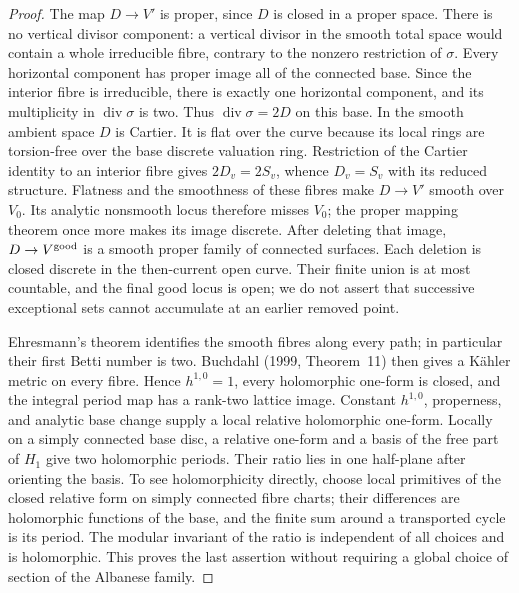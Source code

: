 \begin{proof}
The map \(D\to V'\) is proper, since \(D\) is closed in a proper
space. There is no vertical divisor component: a vertical divisor in
the smooth total space would contain a whole irreducible fibre,
contrary to the nonzero restriction of \(\sigma\). Every horizontal
component has proper image all of the connected base. Since the
interior fibre is irreducible, there is exactly one horizontal
component, and its multiplicity in \(\operatorname{div}\sigma\) is
two. Thus \(\operatorname{div}\sigma=2D\) on this base. In the smooth
ambient space \(D\) is Cartier. It is flat over the curve because
its local rings are torsion-free over the base discrete valuation
ring. Restriction of the Cartier identity to an interior fibre gives
\(2D_v=2S_v\), whence \(D_v=S_v\) with its reduced structure.
Flatness and the smoothness of these fibres make \(D\to V'\) smooth
over \(V_0\). Its analytic nonsmooth locus therefore misses \(V_0\);
the proper mapping theorem once more makes its image discrete.
After deleting that image, \(D\to V^{\rm good}\) is a smooth proper
family of connected surfaces. Each deletion is closed discrete in the
then-current open curve. Their finite union is at most countable,
and the final good locus is open; we do not assert that successive
exceptional sets cannot accumulate at an earlier removed point.

Ehresmann's theorem identifies the smooth fibres along every path;
in particular their first Betti number is two. Buchdahl (1999,
Theorem~11) then gives a K\"ahler metric on every fibre. Hence
\(h^{1,0}=1\), every holomorphic one-form is closed, and the integral
period map has a rank-two lattice image. Constant \(h^{1,0}\),
properness, and analytic base change supply a local relative
holomorphic one-form. Locally on a simply connected
base disc, a relative one-form and a basis of the free part of
\(H_1\) give two holomorphic periods. Their ratio lies in one
half-plane after orienting the basis. To see holomorphicity directly,
choose local primitives of the closed relative form on simply
connected fibre charts; their differences are holomorphic functions
of the base, and the finite sum around a transported cycle is its
period. The modular invariant of the ratio is independent of all
choices and is holomorphic. This proves the last assertion without
requiring a global choice of section of the Albanese family.
\end{proof}

